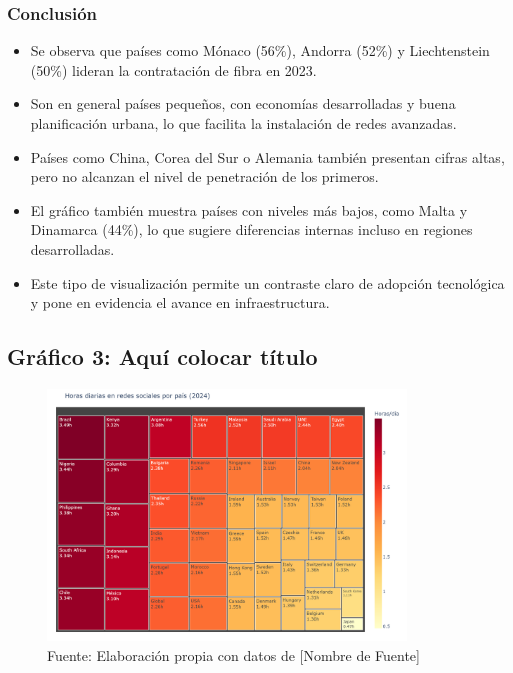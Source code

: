 \documentclass[12pt, a4paper]{article}
\begin{document}
    \subsubsection*{Conclusión}
    \begin{itemize}
        \item Se observa que países como Mónaco (56\%), Andorra (52\%) y Liechtenstein (50\%) lideran la contratación de fibra en 2023.
        \item Son en general países pequeños, con economías desarrolladas y buena planificación urbana, lo que facilita la instalación de redes avanzadas.
        \item Países como China, Corea del Sur o Alemania también presentan cifras altas, pero no alcanzan el nivel de penetración de los primeros.
        \item El gráfico también muestra países con niveles más bajos, como Malta y Dinamarca (44\%), lo que sugiere diferencias internas incluso en regiones desarrolladas.
        \item Este tipo de visualización permite un contraste claro de adopción tecnológica y pone en evidencia el avance en infraestructura.
    \end{itemize}
    


\subsection*{Gráfico 3: Aquí colocar título}
\begin{figure}[H]
    \centering
    \includegraphics[width=0.85\textwidth]{images/graph1_JG.png}
    \caption{Fuente: Elaboración propia con datos de [Nombre de Fuente]}
\end{figure}
\end{document}
